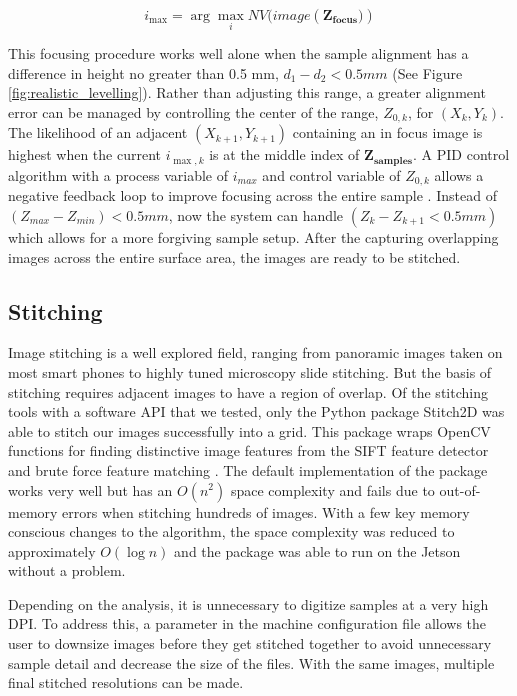 \documentclass[a4paper,12pt]{article}
\begin{document}
\[
    i_{\max} = \arg\max_{i} NV(image(\boldsymbol{{Z_\text{focus}})})
\]
    
This focusing procedure works well alone when the sample alignment has a difference in height no greater than 0.5 mm, $d_1 - d_2 < 0.5 mm $ (See Figure \ref{fig:realistic_levelling}). 
Rather than adjusting this range, a greater alignment error can be managed by controlling the center of the range, $Z_{0,k}$, for $(X_k,Y_k)$. 
The likelihood of an adjacent $(X_{k+1}, Y_{k+1})$ containing an in focus image is highest when the current $i_{{\max,k}}$ is at the middle index of $\boldsymbol{Z_{samples}}$. 
A PID control algorithm with a process variable of $i_{max}$ and control variable of $Z_{0,k}$ allows a negative feedback loop to improve focusing across the entire sample \citep{odwyer_summary_2000}. 
Instead of $(Z_{max} - Z_{min}) < 0.5mm$, now the system can handle $(Z_{k} - Z_{k+1} < 0.5mm)$ which allows for a more forgiving sample setup. After the capturing overlapping images across the entire surface area, the images are ready to be stitched.

\subsection{Stitching}

Image stitching is a well explored field, ranging from panoramic images taken on most smart phones to highly tuned microscopy slide stitching. 
But the basis of stitching requires adjacent images to have a region of overlap. 
Of the stitching tools with a software API that we tested, only the Python package Stitch2D was able to stitch our images successfully into a grid. %
This package wraps OpenCV functions for finding distinctive image features from the SIFT feature detector and brute force feature matching \citep{lowe_distinctive_2004}. 
The default implementation of the package works very well but has an $O(n^2)$ space complexity and fails due to out-of-memory errors when stitching hundreds of images. %
With a few key memory conscious changes to the algorithm, the space complexity was reduced to approximately $O(\log{n})$ and the package was able to run on the Jetson without a problem. 

Depending on the analysis, it is unnecessary to digitize samples at a very high DPI. To address this, a parameter in the machine configuration file 
allows the user to downsize images before they get stitched together to avoid unnecessary sample detail and decrease the size of the files.
With the same images, multiple final stitched resolutions can be made. 
\end{document}
